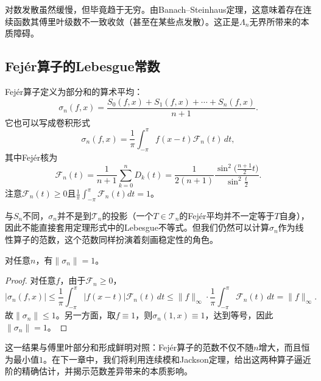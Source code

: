 对数发散虽然缓慢，但毕竟趋于无穷。由Banach–Steinhaus定理，这意味着存在连续函数其傅里叶级数不一致收敛（甚至在某些点发散）。这正是$\Lambda_n$无界所带来的本质障碍。

\subsection{Fejér算子的Lebesgue常数}

Fejér算子定义为部分和的算术平均：
\[
\sigma_n(f,x)=\frac{S_0(f,x)+S_1(f,x)+\cdots+S_n(f,x)}{n+1}.
\]
它也可以写成卷积形式
\[
\sigma_n(f,x)=\frac1\pi\int_{-\pi}^{\pi}f(x-t)\mathcal{F}_n(t)\,dt,
\]
其中Fejér核为
\[
\mathcal{F}_n(t)=\frac1{n+1}\sum_{k=0}^{n}D_k(t)
=\frac{1}{2(n+1)}\frac{\sin^2\!\bigl(\frac{n+1}{2}t\bigr)}{\sin^2\frac{t}{2}}.
\]
注意$\mathcal{F}_n(t)\ge0$且$\frac1\pi\int_{-\pi}^{\pi}\mathcal{F}_n(t)dt=1$。

与$S_n$不同，$\sigma_n$并不是到$\mathcal{T}_n$的投影（一个$T\in\mathcal{T}_n$的Fejér平均并不一定等于$T$自身），因此不能直接套用定理形式中的Lebesgue不等式。但我们仍然可以计算$\sigma_n$作为线性算子的范数，这个范数同样扮演着刻画稳定性的角色。

\begin{theorem}[Fejér算子的范数]
对任意$n$，有$\|\sigma_n\|=1$。
\end{theorem}

\begin{proof}
对任意$f$，由于$\mathcal{F}_n\ge0$，
\[
|\sigma_n(f,x)|\le\frac1\pi\int_{-\pi}^{\pi}|f(x-t)|\mathcal{F}_n(t)\,dt
\le\|f\|_\infty\cdot\frac1\pi\int_{-\pi}^{\pi}\mathcal{F}_n(t)\,dt=\|f\|_\infty.
\]
故$\|\sigma_n\|\le1$。另一方面，取$f\equiv1$，则$\sigma_n(1,x)\equiv1$，达到等号，因此$\|\sigma_n\|=1$。
\end{proof}

这一结果与傅里叶部分和形成鲜明对照：Fejér算子的范数不仅不随$n$增大，而且恒为最小值$1$。在下一章中，我们将利用连续模和Jackson定理，给出这两种算子逼近阶的精确估计，并揭示范数差异带来的本质影响。

